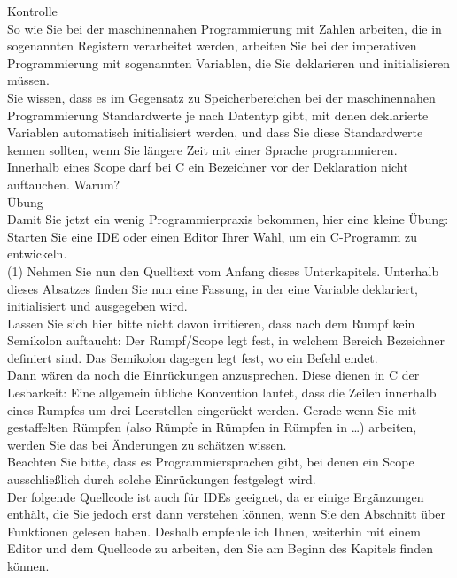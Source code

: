 Kontrolle\\

So wie Sie bei der maschinennahen Programmierung mit Zahlen arbeiten, die in sogenannten Registern verarbeitet werden, arbeiten Sie bei der imperativen Programmierung mit sogenannten Variablen, die Sie deklarieren und initialisieren müssen.\\

Sie wissen, dass es im Gegensatz zu Speicherbereichen bei der maschinennahen Programmierung Standardwerte je nach Datentyp gibt, mit denen deklarierte Variablen automatisch initialisiert werden, und dass Sie diese Standardwerte kennen sollten, wenn Sie längere Zeit mit einer Sprache programmieren.\\

Innerhalb eines Scope darf bei C ein Bezeichner vor der Deklaration nicht auftauchen. Warum?\\

Übung\\

Damit Sie jetzt ein wenig Programmierpraxis bekommen, hier eine kleine Übung:
Starten Sie eine IDE oder einen Editor Ihrer Wahl, um ein C-Programm zu entwickeln.\\

(1) Nehmen Sie nun den Quelltext vom Anfang dieses Unterkapitels. Unterhalb dieses Absatzes finden Sie nun eine Fassung, in der eine Variable deklariert, initialisiert und ausgegeben wird.\\

Lassen Sie sich hier bitte nicht davon irritieren, dass nach dem Rumpf kein Semikolon auftaucht: Der Rumpf/Scope legt fest, in welchem Bereich Bezeichner definiert sind. Das Semikolon dagegen legt fest, wo ein Befehl endet.\\

Dann wären da noch die Einrückungen anzusprechen. Diese dienen in C der Lesbarkeit: Eine allgemein übliche Konvention lautet, dass die Zeilen innerhalb eines Rumpfes um drei Leerstellen eingerückt werden. Gerade wenn Sie mit gestaffelten Rümpfen (also Rümpfe in Rümpfen in Rümpfen in …) arbeiten, werden Sie das bei Änderungen zu schätzen wissen.\\

Beachten Sie bitte, dass es Programmiersprachen gibt, bei denen ein Scope ausschließlich durch solche Einrückungen festgelegt wird.\\

Der folgende Quellcode ist auch für IDEs geeignet, da er einige Ergänzungen enthält, die Sie jedoch erst dann verstehen können, wenn Sie den Abschnitt über Funktionen gelesen haben. Deshalb empfehle ich Ihnen, weiterhin mit einem Editor und dem Quellcode zu arbeiten, den Sie am Beginn des Kapitels finden können. \\

